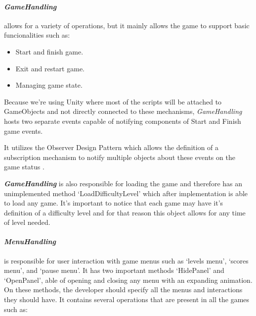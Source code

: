 
\newpage
\paragraph{\textit{GameHandling}} allows for a variety of operations, but it mainly allows the game to support basic funcionalities such as:

\vspace{-\topsep}  %
\begin{itemize}
    \setlength{\itemsep}{8pt}  %
    \setlength{\parskip}{0pt}  %
    \item Start and finish game.
    \item Exit and restart game.
    \item Managing game state.
\end{itemize}
\vspace{-\topsep}  %

Because we're using Unity where most of the scripts will be attached to GameObjects and not directly connected to these mechanisms, \textit{GameHandling} hosts two separate events capable of notifying components of Start and Finish game events.

It utilizes the Observer Design Pattern \cite{observer} which allows the definition of a subscription mechanism to notify multiple objects about these events on the game status \cite{gamma1994design}.

\textbf{\textit{GameHandling}} is also responsible for loading the game and therefore has an unimplemented method `LoadDifficultyLevel' which after implementation is able to load any game. It's important to notice that each game may have it's definition of a difficulty level and for that reason this object allows for any time of level needed.\\

\paragraph{\textit{MenuHandling}} is responsible for user interaction with game menus such as `levels menu', `scores menu', and `pause menu'. It has two important methods `HidePanel' and `OpenPanel', able of opening and closing any menu with an expanding animation. On these methods, the developer should specify all the menus and interactions they should have. It contains several operations that are present in all the games such as:

